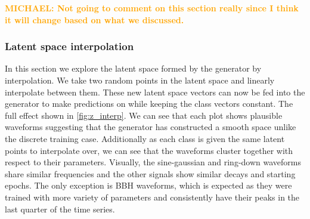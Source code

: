 \documentclass[12pt]{iopart}
\newcommand{\michael}[1]{\textbf{\textcolor{orange}{MICHAEL: #1}}}
\begin{document}
\michael{Not going to comment on this section really since I think it will change based on what we discussed.}

\subsubsection{Latent space interpolation}
In this section we explore the latent space formed by the generator by interpolation. We take two random points in the latent space and linearly interpolate between them. These new latent space vectors can now be fed into the generator to make predictions on while keeping the class vectors constant. The full effect shown in \cref{fig:z_interp}. We can see that each plot shows plausible waveforms suggesting that the generator has constructed a smooth space unlike the discrete training case. Additionally as each class is given the same latent points to interpolate over, we can see that the waveforms cluster together with respect to their parameters. Visually, the sine-gaussian and ring-down waveforms share similar frequencies and the other signals show similar decays and starting epochs. The only exception is BBH waveforms, which is expected as they were trained with more variety of parameters and consistently have their peaks in the last quarter of the time series.
\end{document}
